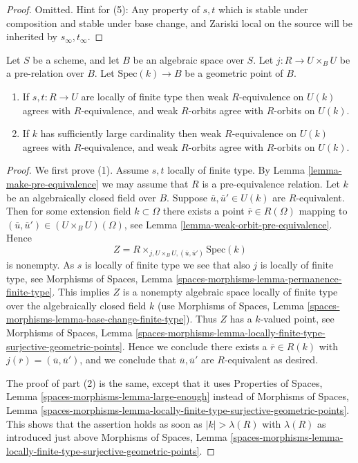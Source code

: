 \begin{proof}
Omitted. Hint for (5): Any property of $s, t$ which is stable under composition
and stable under base change, and Zariski local on the source
will be inherited by $s_\infty, t_\infty$.
\end{proof}

\begin{lemma}
\label{lemma-geometric-orbits}
Let $S$ be a scheme, and let $B$ be an algebraic space over $S$.
Let $j : R \to U \times_B U$ be a pre-relation over $B$.
Let $\text{Spec}(k) \to B$ be a geometric point of $B$.
\begin{enumerate}
\item If $s, t : R \to U$ are locally of finite type
then weak $R$-equivalence on $U(k)$ agrees with $R$-equivalence, and
weak $R$-orbits agree with $R$-orbits on $U(k)$.
\item If $k$ has sufficiently large cardinality then weak $R$-equivalence
on $U(k)$ agrees with $R$-equivalence, and weak $R$-orbits agree
with $R$-orbits on $U(k)$.
\end{enumerate}
\end{lemma}

\begin{proof}
We first prove (1). Assume $s, t$ locally of finite type. By
Lemma \ref{lemma-make-pre-equivalence}
we may assume that $R$ is a pre-equivalence relation.
Let $k$ be an algebraically closed field over $B$.
Suppose $\overline{u}, \overline{u}' \in U(k)$ are $R$-equivalent.
Then for some extension field $k \subset \Omega$ there exists
a point $\overline{r} \in R(\Omega)$ mapping to
$(\overline{u}, \overline{u}') \in (U \times_B U)(\Omega)$, see
Lemma \ref{lemma-weak-orbit-pre-equivalence}.
Hence
$$
Z = R \times_{j, U \times_B U, (\overline{u}, \overline{u}')} \text{Spec}(k)
$$
is nonempty. As $s$ is locally of finite type we see that
also $j$ is locally of finite type, see
Morphisms of Spaces, Lemma \ref{spaces-morphisms-lemma-permanence-finite-type}.
This implies $Z$ is a nonempty algebraic space locally of finite type
over the algebraically closed field $k$ (use
Morphisms of Spaces,
Lemma \ref{spaces-morphisms-lemma-base-change-finite-type}).
Thus $Z$ has a $k$-valued point, see
Morphisms of Spaces, Lemma
\ref{spaces-morphisms-lemma-locally-finite-type-surjective-geometric-points}.
Hence we conclude there exists a $\overline{r} \in R(k)$ with
$j(\overline{r}) = (\overline{u}, \overline{u}')$, and we conclude that
$\overline{u}, \overline{u}'$ are $R$-equivalent as desired.

\medskip\noindent
The proof of part (2) is the same, except that it uses
Properties of Spaces, Lemma \ref{spaces-morphisms-lemma-large-enough}
instead of
Morphisms of Spaces, Lemma
\ref{spaces-morphisms-lemma-locally-finite-type-surjective-geometric-points}.
This shows that the assertion holds as soon as $|k| > \lambda(R)$ with
$\lambda(R)$ as introduced just above
Morphisms of Spaces, Lemma
\ref{spaces-morphisms-lemma-locally-finite-type-surjective-geometric-points}.
\end{proof}

